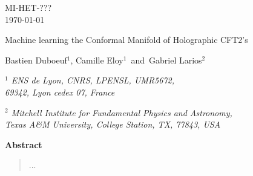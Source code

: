 \documentclass[11pt,a4paper]{article}
\begin{document}
\begin{titlepage}



\begin{flushright}

MI-HET-??? \\
\today
\end{flushright}


\vspace{25pt}

   
   \begin{center}
   \baselineskip=16pt

{\Large Machine learning the Conformal Manifold of Holographic CFT2’s}


   		
\vspace{25pt}
		

{\large  Bastien Duboeuf$^{1}$, Camille Eloy$^{1}$ \,and\, Gabriel Larios$^{2}$}
		
\vspace{25pt}
		
		
	\begin{small}

	{\it $^{1}$ ENS de Lyon, CNRS, LPENSL, UMR5672,\\ 69342, Lyon cedex 07, France}  \\


	\vspace{10pt}
	
	{\it $^{2}$ Mitchell Institute for Fundamental Physics and Astronomy, \\
	Texas A\&M University, College Station, TX, 77843, USA}     \\
		
	\end{small}
		

\vskip 50pt

\end{center}


\begin{center}
\textbf{Abstract}
\end{center}


\begin{quote}

...

\end{quote}

\vfill

\end{titlepage}


\tableofcontents
\end{document}
